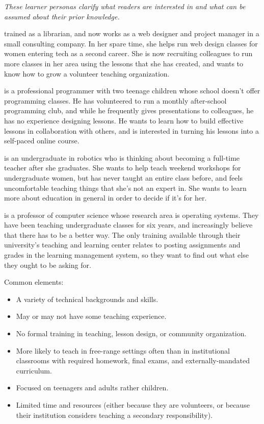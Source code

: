 \emph{These learner personas clarify what readers are interested in and what
can be assumed about their prior knowledge.}

\begin{description}
\tightlist
\item[Emily]
trained as a librarian, and now works as a web designer and project
manager in a small consulting company. In her spare time, she helps
run web design classes for women entering tech as a second career.
She is now recruiting colleagues to run more classes in her area
using the lessons that she has created, and wants to know how to
grow a volunteer teaching organization.
\item[Moshe]
is a professional programmer with two teenage children whose school
doesn't offer programming classes. He has volunteered to run a
monthly after-school programming club, and while he frequently gives
presentations to colleagues, he has no experience designing lessons.
He wants to learn how to build effective lessons in collaboration
with others, and is interested in turning his lessons into a
self-paced online course.
\item[Samira]
is an undergraduate in robotics who is thinking about becoming a
full-time teacher after she graduates. She wants to help teach
weekend workshops for undergraduate women, but has never taught an
entire class before, and feels uncomfortable teaching things that
she's not an expert in. She wants to learn more about education in
general in order to decide if it's for her.
\item[Gene]
is a professor of computer science whose research area is operating
systems. They have been teaching undergraduate classes for six
years, and increasingly believe that there has to be a better way.
The only training available through their university's teaching and
learning center relates to posting assignments and grades in the
learning management system, so they want to find out what else they
ought to be asking for.
\end{description}

Common elements:

\begin{itemize}
\item
  A variety of technical backgrounds and skills.
\item
  May or may not have some teaching experience.
\item
  No formal training in teaching, lesson design, or community
  organization.
\item
  More likely to teach in free-range settings often than in
  institutional classrooms with required homework, final exams, and
  externally-mandated curriculum.
\item
  Focused on teenagers and adults rather children.
\item
  Limited time and resources (either because they are volunteers, or
  because their institution considers teaching a secondary
  responsibility).
\end{itemize}


